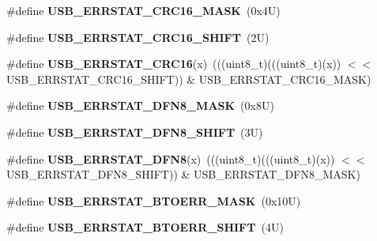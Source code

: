 \begin{DoxyCompactItemize}
\#define {\bfseries U\+S\+B\+\_\+\+E\+R\+R\+S\+T\+A\+T\+\_\+\+C\+R\+C16\+\_\+\+M\+A\+SK}~(0x4\+U)
\item 
\mbox{\label{group___u_s_b___register___masks_gaf0bd8a085cd33bc98cf89d6ea726be46}} 
\#define {\bfseries U\+S\+B\+\_\+\+E\+R\+R\+S\+T\+A\+T\+\_\+\+C\+R\+C16\+\_\+\+S\+H\+I\+FT}~(2\+U)
\item 
\mbox{\label{group___u_s_b___register___masks_gac7e96cf4b85807afc7c920313b5ca9b0}} 
\#define {\bfseries U\+S\+B\+\_\+\+E\+R\+R\+S\+T\+A\+T\+\_\+\+C\+R\+C16}(x)~(((uint8\+\_\+t)(((uint8\+\_\+t)(x)) $<$$<$ U\+S\+B\+\_\+\+E\+R\+R\+S\+T\+A\+T\+\_\+\+C\+R\+C16\+\_\+\+S\+H\+I\+FT)) \& U\+S\+B\+\_\+\+E\+R\+R\+S\+T\+A\+T\+\_\+\+C\+R\+C16\+\_\+\+M\+A\+SK)
\item 
\mbox{\label{group___u_s_b___register___masks_gaf2aaf7552c127da34a4252936afe561a}} 
\#define {\bfseries U\+S\+B\+\_\+\+E\+R\+R\+S\+T\+A\+T\+\_\+\+D\+F\+N8\+\_\+\+M\+A\+SK}~(0x8\+U)
\item 
\mbox{\label{group___u_s_b___register___masks_gae26a3aed245ac0546edc65afaa2c5542}} 
\#define {\bfseries U\+S\+B\+\_\+\+E\+R\+R\+S\+T\+A\+T\+\_\+\+D\+F\+N8\+\_\+\+S\+H\+I\+FT}~(3\+U)
\item 
\mbox{\label{group___u_s_b___register___masks_gad1d254580c4c29d95e8427b96c0d2983}} 
\#define {\bfseries U\+S\+B\+\_\+\+E\+R\+R\+S\+T\+A\+T\+\_\+\+D\+F\+N8}(x)~(((uint8\+\_\+t)(((uint8\+\_\+t)(x)) $<$$<$ U\+S\+B\+\_\+\+E\+R\+R\+S\+T\+A\+T\+\_\+\+D\+F\+N8\+\_\+\+S\+H\+I\+FT)) \& U\+S\+B\+\_\+\+E\+R\+R\+S\+T\+A\+T\+\_\+\+D\+F\+N8\+\_\+\+M\+A\+SK)
\item 
\mbox{\label{group___u_s_b___register___masks_ga64f9bd307b556ecbd454571aa2d1b4c8}} 
\#define {\bfseries U\+S\+B\+\_\+\+E\+R\+R\+S\+T\+A\+T\+\_\+\+B\+T\+O\+E\+R\+R\+\_\+\+M\+A\+SK}~(0x10\+U)
\item 
\mbox{\label{group___u_s_b___register___masks_gaa6f963350f684e982457839f7bc842e5}} 
\#define {\bfseries U\+S\+B\+\_\+\+E\+R\+R\+S\+T\+A\+T\+\_\+\+B\+T\+O\+E\+R\+R\+\_\+\+S\+H\+I\+FT}~(4\+U)

\end{DoxyCompactItemize}

